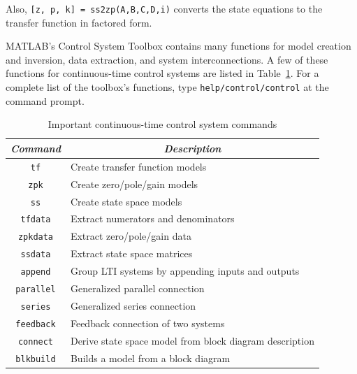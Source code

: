 Also, \verb#[z, p, k] = ss2zp(A,B,C,D,i)# converts the state equations to the transfer function in factored form.
\par
MATLAB's Control System Toolbox contains many functions for model creation and inversion, data extraction, and system interconnections.  A few of these functions for continuous-time control systems are listed in Table~\ref{tab.statespace.ConSysTool}.  For a complete list of the toolbox's functions, type \verb=help/control/control= at the command prompt.

\begin{table}[bht]
\centering
\begin{tabular}{c|p{}}
    \textit{Command}& \multicolumn{1}{c}{\textit{Description}}\\ \hline \hline
    \verb=tf=       &   Create transfer function models \\
    \verb=zpk=      &   Create zero/pole/gain models \\
    \verb=ss=       &   Create state space models \\
    \verb=tfdata=   &   Extract numerators and denominators \\
    \verb=zpkdata=  &   Extract zero/pole/gain data \\
    \verb=ssdata=   &   Extract state space matrices \\
    \verb=append=   &   Group LTI systems by appending inputs and outputs \\
    \verb=parallel= &   Generalized parallel connection \\
    \verb=series=   &   Generalized series connection \\
    \verb=feedback= &   Feedback connection of two systems \\
    \verb=connect=  &   Derive state space model from block diagram description \\
    \verb=blkbuild= &   Builds a model from a block diagram
\end{tabular}
\caption{\footnotesize
        Important continuous-time control system commands
        \label{tab.statespace.ConSysTool}
        }
\end{table}


